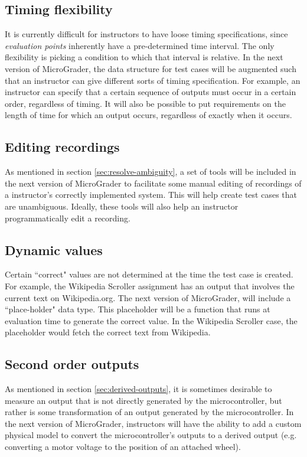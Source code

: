 \documentclass[12pt]{article}
\begin{document}
\subsection{Timing flexibility}
It is currently difficult for instructors to have loose timing specifications, since \textit{evaluation points} inherently have a pre-determined time interval.  The only flexibility is picking a condition to which that interval is relative.  In the next version of MicroGrader, the data structure for test cases will be augmented such that an instructor can give different sorts of timing specification.  For example, an instructor can specify that a certain sequence of outputs must occur in a certain order, regardless of timing.  It will also be possible to put requirements on the length of time for which an output occurs, regardless of exactly when it occurs.

\subsection{Editing recordings}
As mentioned in section \ref{sec:resolve-ambiguity}, a set of tools will be included in the next version of MicroGrader to facilitate some manual editing of recordings of a instructor's correctly implemented system.  This will help create test cases that are unambiguous.  Ideally, these tools will also help an instructor programmatically edit a recording.

\subsection{Dynamic values}
Certain ``correct" values are not determined at the time the test case is created.  For example, the Wikipedia Scroller assignment has an output that involves the current text on Wikipedia.org.  The next version of MicroGrader, will include a ``place-holder" data type.  This placeholder will be a function that runs at evaluation time to generate the correct value.  In the Wikipedia Scroller case, the placeholder would fetch the correct text from Wikipedia.

\subsection{Second order outputs}
As mentioned in section \ref{sec:derived-outputs}, it is sometimes desirable to measure an output that is not directly generated by the microcontroller, but rather is some transformation of an output generated by the microcontroller.  In the next version of MicroGrader, instructors will have the ability to add a custom physical model to convert the microcontroller's outputs to a derived output (e.g. converting a motor voltage to the position of an attached wheel).
\end{document}
